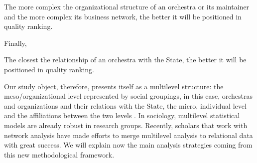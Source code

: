 \documentclass[a4paper, 12pt, openright, oneside, german, french, brazil, english]{abntex2}
\begin{document}
		
	\begin{hip}
		The more complex the organizational structure of an orchestra or its maintainer and the more complex its business network, the better it will be positioned in quality ranking.
	\end{hip}
	
	Finally,
	
	\begin{hip}
	The closest the relationship of an orchestra with the State, the better it will be positioned in quality ranking.
	\end{hip}
	
	

	Our study object, therefore, presents itself as a multilevel structure: the meso/organizational level represented by social groupings, in this case, orchestras and organizations and their relations with the State, the micro, individual level and the affiliations between the two levels \cite{brailly2016market,eloire2009reseaux,lazega2008catching,favre2016inter,lazega2016synchronization}. In sociology, multilevel statistical models are already robust in research groups. Recently, scholars that work with network analysis have made efforts to merge multilevel analysis to relational data with great success. We will explain now the main analysis strategies coming from this new methodological framework.
	
\end{document}

